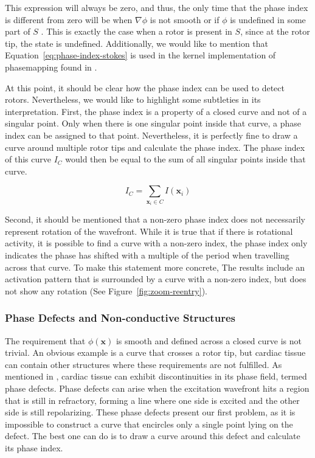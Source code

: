 \documentclass[twocolumn]{article}
\begin{document}
\noindent This expression will always be zero,
and thus, the only time that the phase index is different from zero will be when
$\nabla \phi$ is not smooth or if $\phi$ is undefined in some part of $S$ \autocite{herlin2012reconstruction}.
This is exactly the case when a rotor is present in $S$,
since at the rotor tip, the state is undefined.
Additionally, we would like to mention that Equation~\ref{eq:phase-index-stokes}
is used in the kernel implementation of phasemapping found in \textcite{2001theoretical_convolution_method_bray}.

At this point, it should be clear how the phase index can be used to detect rotors.
Nevertheless, we would like to highlight some subtleties in its interpretation.
First, the phase index is a property of a closed curve
and not of a singular point.
Only when there is one singular point inside that curve,
a phase index can be assigned to that point.
Nevertheless, it is perfectly fine to draw a curve around multiple rotor tips
and calculate the phase index.
The phase index of this curve $I_C$ would then be equal to the sum of all singular points inside that curve.

\begin{equation}
  I_C = \sum_{\bm{x}_i\in C} I(\bm{x}_i)
  \label{eq:index-curve}
\end{equation}

Second, it should be mentioned that a non-zero phase index does not necessarily represent rotation of the wavefront.
While it is true that if there is rotational activity,
it is possible to find a curve with a non-zero index,
the phase index only indicates the phase has shifted with a multiple of the period
when travelling across that curve.
To make this statement more concrete,
The results include an activation pattern that is surrounded by a curve with a non-zero index,
but does not show any rotation (See Figure~\ref{fig:zoom-reentry}).

\subsubsection{Phase Defects and Non-conductive Structures}

The requirement that $\phi(\bm{x})$ is smooth and defined across a closed curve
is not trivial.
An obvious example is a curve that crosses a rotor tip,
but cardiac tissue can contain other structures where these requirements are not fulfilled.
As mentioned in \textcite{arno2021a, tomii2021spatial},
cardiac tissue can exhibit discontinuities in its phase field, termed phase defects.
Phase defects can arise when the excitation wavefront hits a region
that is still in refractory,
forming a line where one side is excited and the other side is still repolarizing.
These phase defects present our first problem,
as it is impossible to construct a curve
that encircles only a single point lying on the defect.
The best one can do is to draw a curve around this defect and calculate its phase index.
\end{document}

